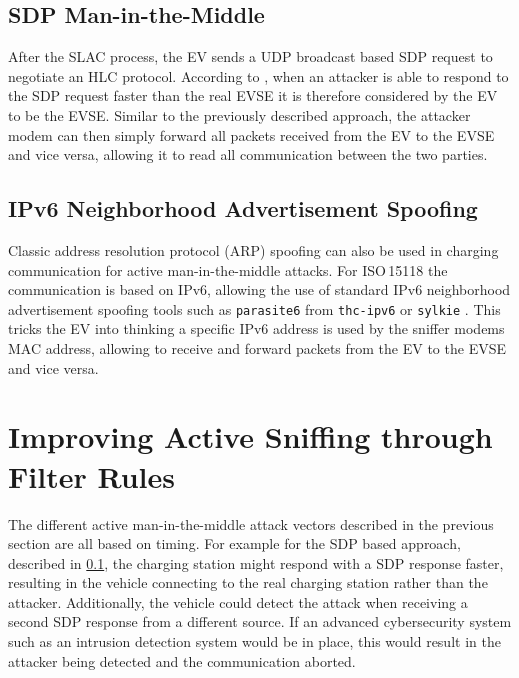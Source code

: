 \documentclass[sigconf]{acmart}
\begin{document}
\subsection{SDP Man-in-the-Middle}
\label{sec:sdp-mitm}
After the SLAC process, the EV sends a UDP broadcast based SDP request to negotiate an HLC protocol. According to \citep[p.\,9]{bao_threat_2018}, when an attacker is able to respond to the SDP request faster than the real EVSE it is therefore considered by the EV to be the EVSE. Similar to the previously described approach, the attacker modem can then simply forward all packets received from the EV to the EVSE and vice versa, allowing it to read all communication between the two parties.

\subsection{IPv6 Neighborhood Advertisement Spoofing}
Classic address resolution protocol (ARP) spoofing can also be used in charging communication for active man-in-the-middle attacks.
For ISO\,15118 the communication is based on IPv6, allowing the use of standard IPv6 neighborhood advertisement spoofing tools such as \texttt{parasite6} from \texttt{thc-ipv6} \cite{thcIpv6} or \texttt{sylkie} \cite{sylkie}.
This tricks the EV into thinking a specific IPv6 address is used by the sniffer modems MAC address, allowing to receive and forward packets from the EV to the EVSE and vice versa.

\section{Improving Active Sniffing through Filter Rules}
\label{sec:filter-rules}

The different active man-in-the-middle attack vectors described in the previous section are all based on timing.
For example for the SDP based approach, described in \ref{sec:sdp-mitm}, the charging station might respond with a SDP response faster, resulting in the vehicle connecting to the real charging station rather than the attacker.
Additionally, the vehicle could detect the attack when receiving a second SDP response from a different source.
If an advanced cybersecurity system such as an intrusion detection system would be in place, this would result in the attacker being detected and the communication aborted.
\end{document}
